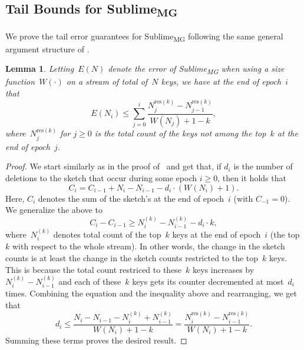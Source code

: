 \documentclass[sigconf]{acmart}
\newtheorem{lemma}[theorem]{Lemma}
\newcommand{\sketch}{Sublime}
\newcommand{\sketchmg}{\sketch\textsubscript{MG}\xspace}
\begin{document}
\subsection{Tail Bounds for \sketchmg}\label{sec:upper_bounds_mg_res}
We prove the tail error guarantees for \sketchmg following the same general
argument structure of .

\begin{lemma}\label{lemma:mg-res-w}
    Letting~$E(N)$ denote the error of \sketchmg when using a size
    function~$W(\cdot)$ on a stream of total of~$N$ keys, we have at the end of
    epoch~$i$ that
    $$ E(N_i) \leq \sum_{j=0}^i \frac{N^{\text{res}(k)}_j-N^{\text{res}(k)}_{j-1}}{W(N_j)+1-k}, $$
    where~$N^{\text{res}(k)}_j$ for $j\geq 0$ is the total count of the keys
    not among the top~$k$ at the end of epoch~$j$.
\end{lemma}
\begin{proof}
    We start similarly as in the proof of~ and get that, if
    $d_i$ is the number of deletions to the sketch that occur during some epoch
    $i \geq 0$, then it holds that
    $$ C_i = C_{i-1} + N_i - N_{i-1} - d_i \cdot (W(N_i)+1). $$
    Here, $C_i$ denotes the sum of the sketch's at the end of epoch~$i$ (with
    $C_{-1}=0$). We generalize the above to
    $$ C_i - C_{i-1} \geq  N^{(k)}_i - N^{(k)}_{i-1} - d_i \cdot k,$$
    where~$N^{(k)}_i $ denotes total count of the top~$k$ keys at the end of
    epoch~$i$ (the top $k$ with respect to the whole stream). In other words,
    the change in the sketch counts is at least the change in the sketch counts
    restricted to the top~$k$ keys. This is because the total count restriced
    to these~$k$ keys increases by~$N^{(k)}_i - N^{(k)}_{i-1}$ and each of
    these~$k$ keys gets its counter decremented at most~$d_i$ times.
    Combining the equation and the inequality above and rearranging, we get
    that
    $$ d_i \leq \frac{N_i - N_{i-1} -N^{(k)}_i + N^{(k)}_{i-1}}{W(N_i)+1-k} =  \frac{N^{\text{res}(k)}_i- N^{\text{res}(k)}_{i-1}}{W(N_i)+1-k}. $$
    Summing these terms proves the desired result.
\end{proof}
\end{document}
